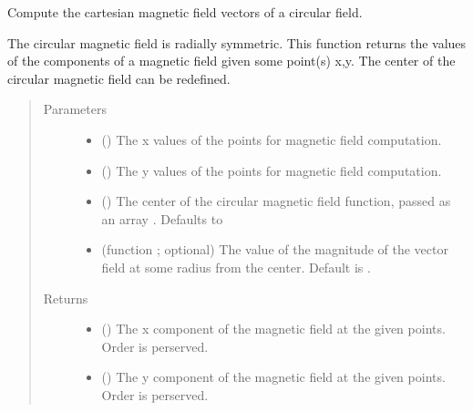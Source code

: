 \documentclass[letterpaper,10pt,english]{sphinxmanual}
\begin{document}
\begin{fulllineitems}
\label{\detokenize{magnetic_field_functions_2d:magnetic_field_functions_2d.circular_magnetic_field_cart_2d}}
Compute the cartesian magnetic field vectors of a circular field.

The circular magnetic field is radially symmetric. This function returns
the values of the components of a magnetic field given some point(s) x,y.
The center of the circular magnetic field can be redefined.
\begin{quote}\begin{description}
\item[{Parameters}] \leavevmode\begin{itemize}
\item {} 
 () \textendash{} The x values of the points for magnetic field computation.

\item {} 
 () \textendash{} The y values of the points for magnetic field computation.

\item {} 
 () \textendash{} The center of the circular magnetic field function, passed as an
array \sphinxcode{\sphinxupquote{{[}x0,y0{]}}}. Defaults to \sphinxcode{\sphinxupquote{{[}0,0{]}}}

\item {} 
 (function ; optional) \textendash{} The value of the magnitude of the vector field at some radius from
the center. Default is .

\end{itemize}

\item[{Returns}] \leavevmode
\begin{itemize}
\item {} 
 () \textendash{} The x component of the magnetic field at the given points. Order
is perserved.

\item {} 
 () \textendash{} The y component of the magnetic field at the given points. Order
is perserved.

\end{itemize}


\end{description}\end{quote}

\end{fulllineitems}
\end{document}
